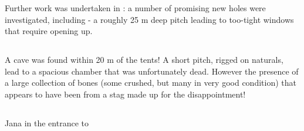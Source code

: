 Further work was undertaken in : a number of promising new
holes were investigated, including  - a roughly 25 m deep
pitch leading to too-tight windows that require opening up.

\subsection{}

A cave was found within 20 m of the tents! A short pitch, rigged on
naturals, lead to a spacious chamber that was unfortunately dead.
However the presence of a large collection of bones (some crushed, but
many in very good condition) that appears to have been from a stag made
up for the disappointment!

\subsection{}

\begin{marginfigure}
\caption{Jana in the entrance to  }
\end{marginfigure}

